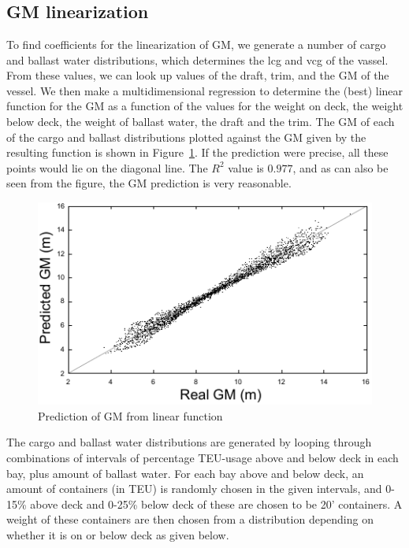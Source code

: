 \section{}\label{sec:implementation}
\subsection{GM linearization}
To find coefficients for the linearization of GM, we generate a number of cargo and ballast water distributions, which determines the lcg and vcg of the vassel. From these values, we can look up values of the draft, trim, and the GM of the vessel. %
We then make a multidimensional regression to determine the (best) linear function for the GM as a function of the values for the weight on deck, the weight below deck, the weight of ballast water, the draft and the trim. The GM of each of the cargo and ballast distributions plotted against the GM given by the resulting function is shown in Figure~\ref{fig:predictGM}. If the prediction were precise, all these points would lie on the diagonal line. The $R^2$ value is $0.977$, and as can also be seen from the figure, the GM prediction is very reasonable.

\begin{figure}[pos=htbp]
	\centering
		\includegraphics[scale=1]{figures/gnuPlotAll.pdf}
	\caption{Prediction of GM from linear function}
	\label{fig:predictGM}
\end{figure}

The cargo and ballast water distributions are generated by looping through combinations of intervals of percentage TEU-usage above and below deck in each bay, plus amount of ballast water. For each bay above and below deck, an amount of containers (in TEU) is randomly chosen in the given intervals, and 0-15\% above deck and 0-25\% below deck of these are chosen to be 20' containers. A weight of these containers are then chosen from a distribution depending on whether it is on or below deck as given below.

